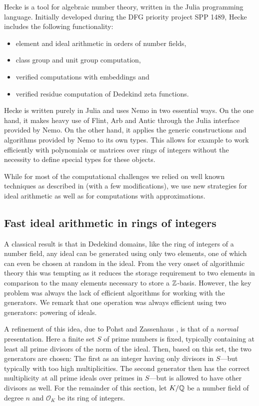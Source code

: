 \documentclass{sig-alternate-05-2015}
\begin{document}
Hecke is a tool for algebraic number theory, written in the Julia programming language.
Initially developed during the DFG priority project SPP 1489, Hecke includes the following functionality:
\begin{itemize}
\item
  element and ideal arithmetic in orders of number fields,
\item
  class group and unit group computation,
\item
  verified computations with embeddings and
\item
  verified residue computation of Dedekind zeta functions.
\end{itemize}

Hecke is written purely in Julia and uses Nemo in two essential ways. On the one hand, it makes heavy use of Flint, Arb and Antic through the Julia interface provided by Nemo.
On the other hand, it applies the generic constructions and algorithms provided by Nemo to its own types. This allows for example to work efficiently with polynomials or matrices over rings of integers without the necessity to define special types for these objects.

While for most of the computational challenges we relied on well known techniques as described in \cite{Cohen1993, Pohst1997, Belabas2004} (with a few modifications), we use new strategies for ideal arithmetic as well as for computations with approximations.

\subsection{Fast ideal arithmetic in rings of integers}

A classical result is that in Dedekind domains, like the ring of integers of a number field, any
ideal can be generated using only two elements, one of which can even be chosen
at random in the ideal. From the very onset of algorithmic theory this was
tempting as it reduces the storage requirement to two elements in comparison to the many elements necessary to
store a $\mathbb{Z}$-basis. However, the key problem was always the lack of
efficient algorithms for working with the generators. We remark that one
operation was always efficient using two generators: powering of ideals.

A refinement of this idea, due to Pohst and Zassenhaus \cite[p. 400]{Pohst1997}, is that
of a \textit{normal} presentation. Here a finite set $S$ of prime numbers
is fixed, typically containing at least all prime divisors of the norm of the ideal. Then,
based on this set, the two generators are chosen: The first as an integer
having only divisors in $S$---but typically with too high multiplicities.
The second generator then has the correct multiplicity at all prime ideals
over primes in $S$---but is allowed to have other divisors as well.
For the remainder of this section, let $K/\mathbb{Q}$ be a number field of
degree $n$ and $\mathcal O_K$ be its ring of integers.
\end{document}
